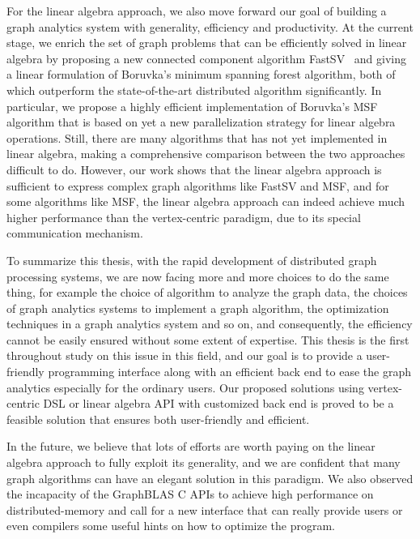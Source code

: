 \documentclass{sokendai_thesis} %
\begin{document}
For the linear algebra approach, we also move forward our goal of building a graph analytics system with generality, efficiency and productivity.
At the current stage, we enrich the set of graph problems that can be efficiently solved in linear algebra by proposing a new connected component algorithm FastSV~\cite{fastsv} and giving a linear formulation of Boruvka's minimum spanning forest algorithm, both of which outperform the state-of-the-art distributed algorithm significantly.
In particular, we propose a highly efficient implementation of Boruvka's MSF algorithm that is based on yet a new parallelization strategy for linear algebra operations.
Still, there are many algorithms that has not yet implemented in linear algebra, making a comprehensive comparison between the two approaches difficult to do.
However, our work shows that the linear algebra approach is sufficient to express complex graph algorithms like FastSV and MSF, and for some algorithms like MSF, the linear algebra approach can indeed achieve much higher performance than the vertex-centric paradigm, due to its special communication mechanism.

To summarize this thesis, with the rapid development of distributed graph processing systems, we are now facing more and more choices to do the same thing, for example the choice of algorithm to analyze the graph data, the choices of graph analytics systems to implement a graph algorithm, the optimization techniques in a graph analytics system and so on, and consequently, the efficiency cannot be easily ensured without some extent of expertise.
This thesis is the first throughout study on this issue in this field, and our goal is to provide a user-friendly programming interface along with an efficient back end to ease the graph analytics especially for the ordinary users.
Our proposed solutions using vertex-centric DSL or linear algebra API with customized back end is proved to be a feasible solution that ensures both user-friendly and efficient.


In the future, we believe that lots of efforts are worth paying on the linear algebra approach to fully exploit its generality, and we are confident that many graph algorithms can have an elegant solution in this paradigm.
We also observed the incapacity of the GraphBLAS C APIs to achieve high performance on distributed-memory and call for a new interface that can really provide users or even compilers some useful hints on how to optimize the program.

%


\end{document}
